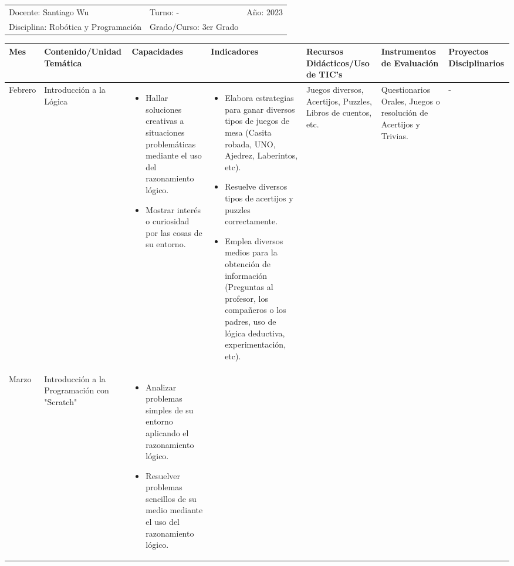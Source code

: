 \documentclass[landscape, a4paper, 10pt]{article}
\newcommand{\smallcellwidth}{0.7in}
\newcommand{\normalcellwidth}{1.2in}
\newcommand{\bigcellwidth}{2.0in}
\newcommand{\profesor}{Santiago Wu}
\newcommand{\discipline}{Robótica y Programación}
\newcommand{\currentyear}{2023}
\begin{document}
	\begin{tabularx}{\textwidth}{ >{\raggedright\arraybackslash}X >{\raggedright\arraybackslash}X >{\raggedright\arraybackslash}X }
		Docente: \profesor &
		Turno: - &
		Año: \currentyear \\
		Disciplina: \discipline &
		Grado/Curso: 3er Grado &
		 \\
	\end{tabularx}
	\centering
	\begin{longtable}{|m{\smallcellwidth}|p{\normalcellwidth}|p{\bigcellwidth}|p{\bigcellwidth}|p{\normalcellwidth}|p{\normalcellwidth}|p{\normalcellwidth}|}
		\hline
		\textbf{Mes} &
		\textbf{Contenido/Unidad Temática} &
		\textbf{Capacidades} &
		\textbf{Indicadores} &
		\textbf{Recursos Didácticos/Uso de TIC's} &
		\textbf{Instrumentos de Evaluación} &
		\textbf{Proyectos Disciplinarios} \\
		\hline
		\endhead
		Febrero &
		Introducción a la Lógica &
		\begin{itemize}
			\item Hallar soluciones creativas a situaciones problemáticas mediante el uso del razonamiento lógico.
			\item Mostrar interés o curiosidad por las cosas de su entorno.
		\end{itemize} &
		\begin{itemize}
			\item Elabora estrategias para ganar diversos tipos de juegos de mesa (Casita robada, UNO, Ajedrez, Laberintos, etc).
			\item Resuelve diversos tipos de acertijos y puzzles correctamente.
			\item Emplea diversos medios para la obtención de información (Preguntas al profesor, los compañeros o los padres, uso de lógica deductiva, experimentación, etc).
 		\end{itemize} &
		Juegos diversos, Acertijos, Puzzles, Libros de cuentos, etc. &
		Questionarios Orales, Juegos o resolución de Acertijos y Trivias. &
		 - \\
		\hline
		Marzo &
		Introducción a la Programación con "Scratch" &
		\begin{itemize}
			\item Analizar problemas simples de su entorno aplicando el razonamiento lógico.
			\item Resuelver problemas sencillos de su medio mediante el uso del razonamiento lógico.

\end{itemize}
\end{longtable}
\end{document}
